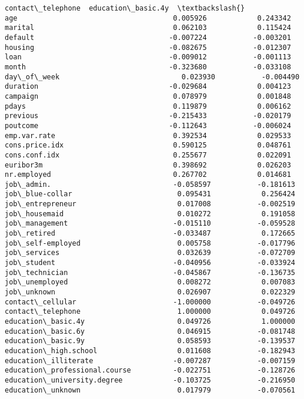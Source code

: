 \documentclass[11pt]{article}
\begin{document}
\begin{tcolorbox}[breakable, size=fbox, boxrule=.5pt, pad at break*=1mm, opacityfill=0]
\begin{Verbatim}[commandchars=\\\{\}]
                               contact\_telephone  education\_basic.4y  \textbackslash{}
age                                     0.005926            0.243342
marital                                 0.062103            0.115424
default                                -0.007224           -0.003201
housing                                -0.082675           -0.012307
loan                                   -0.009012           -0.001113
month                                  -0.323680           -0.033108
day\_of\_week                             0.023930           -0.004490
duration                               -0.029684            0.004123
campaign                                0.078979            0.001848
pdays                                   0.119879            0.006162
previous                               -0.215433           -0.020179
poutcome                               -0.112643           -0.006024
emp.var.rate                            0.392534            0.029533
cons.price.idx                          0.590125            0.048761
cons.conf.idx                           0.255677            0.022091
euribor3m                               0.398692            0.026203
nr.employed                             0.267702            0.014681
job\_admin.                             -0.058597           -0.181613
job\_blue-collar                         0.095431            0.256424
job\_entrepreneur                        0.017008           -0.002519
job\_housemaid                           0.010272            0.191058
job\_management                         -0.015110           -0.059528
job\_retired                            -0.033487            0.172665
job\_self-employed                       0.005758           -0.017796
job\_services                            0.032639           -0.072709
job\_student                            -0.040956           -0.033924
job\_technician                         -0.045867           -0.136735
job\_unemployed                          0.008272            0.007083
job\_unknown                             0.026907            0.022329
contact\_cellular                       -1.000000           -0.049726
contact\_telephone                       1.000000            0.049726
education\_basic.4y                      0.049726            1.000000
education\_basic.6y                      0.046915           -0.081748
education\_basic.9y                      0.058593           -0.139537
education\_high.school                   0.011608           -0.182943
education\_illiterate                   -0.007287           -0.007159
education\_professional.course          -0.022751           -0.128726
education\_university.degree            -0.103725           -0.216950
education\_unknown                       0.017979           -0.070561


\end{Verbatim}
\end{tcolorbox}
\end{document}

